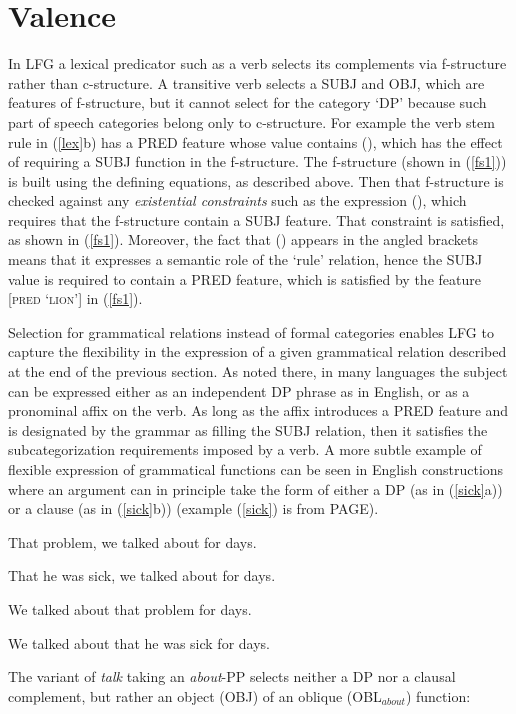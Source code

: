 \section{Valence} 
\label{valence-sec}
In LFG a lexical predicator such as a verb selects its complements via f-structure rather than c-structure.  A transitive verb selects a SUBJ and OBJ, which are features of f-structure, but it cannot select for the category `DP' because such part of speech categories belong only to c-structure.  For example the verb stem rule in (\ref{lex}b) has a PRED feature whose value contains (\up {}), which has the effect of requiring a SUBJ function in the f-structure.    The f-structure (shown in (\ref{fs1})) is built using the defining equations, as described above.  Then that f-structure is checked against any \textit{existential constraints} such as  the expression (\up {}), which requires that the f-structure contain a SUBJ feature.  That constraint is satisfied, as shown in (\ref{fs1}).  Moreover, the fact that (\up {}) appears in the angled brackets means that it expresses a semantic role of the `rule' relation, hence the SUBJ value is required to contain a PRED feature, which is satisfied by the feature [\textsc{pred} `\textsc{lion}'] in  (\ref{fs1}).  

Selection for grammatical relations instead of formal categories enables LFG to capture the  flexibility in the expression of a given grammatical relation described at the end of the previous section.  As noted there, in many languages the subject can be expressed either as an independent DP phrase as in English, or as a pronominal affix on the verb.  As long as the affix introduces a PRED feature and is designated by the grammar as filling the SUBJ relation, then it satisfies the subcategorization requirements imposed by a verb.  A more subtle example of flexible expression of grammatical functions  can be seen in English constructions where an argument can in principle take the form of either a DP (as in (\ref{sick}a)) or a clause (as in (\ref{sick}b)) (example (\ref{sick}) is from \cite{BATW2015a} PAGE).  

\eal 
 \label{sick}
\ex That problem, we talked about for days.

\ex  That he was sick, we talked about for days.

\ex We talked about that problem for days.

\ex *We talked about that he was sick for days.

\zl
The variant of \textit{talk} taking an \textit{about}-PP selects neither a DP nor a clausal complement, but rather an object (OBJ) of an oblique (OBL$_{about}$) function:  

